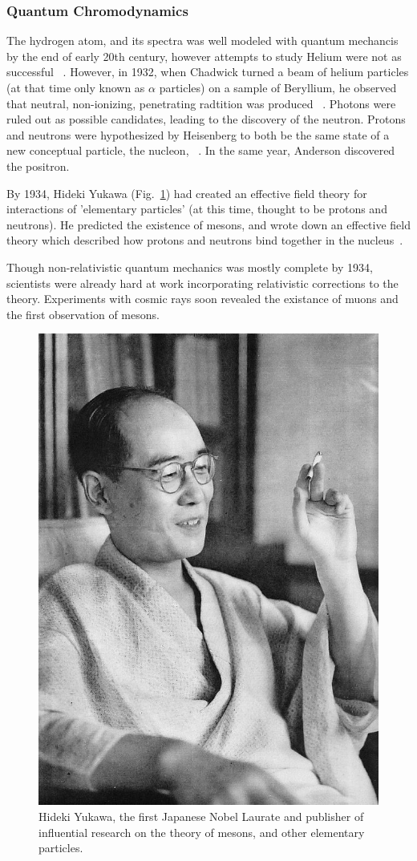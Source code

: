 \clearpage
\subsubsection{Quantum Chromodynamics}

The hydrogen atom, and its spectra was well modeled with quantum mechancis by
the end of early 20th century, however attempts to study Helium were not as
successful ~\needcite{}. However, in 1932,  when Chadwick turned a beam of
helium particles (at that time only known as $\alpha$ particles) on a sample of
Beryllium, he observed that neutral, non-ionizing, penetrating radtition was
produced ~\cite{KraussParticleHistory}. Photons were ruled out as possible
candidates, leading to the discovery of the neutron. Protons and neutrons were
hypothesized by Heisenberg to both be the same state of a new conceptual
particle, the nucleon, ~\cite{Heisenberg1952}. In the same year, Anderson
discovered the positron. 

By 1934, Hideki Yukawa (Fig.~\ref{fig:hidekiyukawa}) had created an effective
field theory for interactions of 'elementary particles' (at this time, thought
to be protons and neutrons). He predicted the existence of mesons, and wrote
down an effective field theory which described how protons and neutrons bind
together in the nucleus~\cite{Yukawa1935}. 

Though non-relativistic quantum mechanics was mostly complete by 1934,
scientists were already hard at work incorporating relativistic corrections to
the theory. Experiments with cosmic rays soon revealed the existance of muons
and the first observation of mesons.

\begin{figure}[ht]
	\begin{center}
		\includegraphics[width=0.5\linewidth]{../Chapter2/fig/hidekiyukawa.jpg}
	\caption{
		Hideki Yukawa, the first Japanese Nobel Laurate and publisher of influential
		research on the theory of mesons, and other elementary particles.
	}
	\label{fig:hidekiyukawa}
\end{center}
\end{figure}

